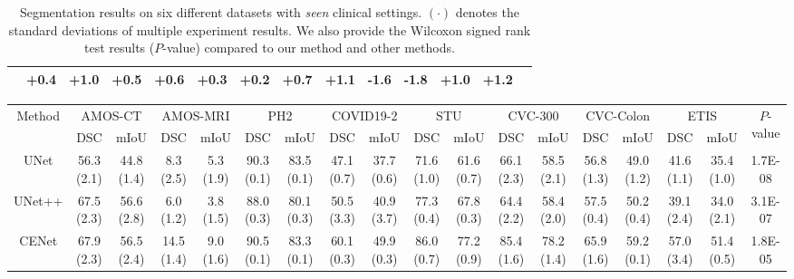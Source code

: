 \begin{table*}[t]
\begin{tabular}{c|cc|cc|cc|cc|cc|cc|c}
     & \textbf{+0.4} & \textbf{+1.0} & \textbf{+0.5} & \textbf{+0.6} & \textbf{+0.3} & \textbf{+0.2} & \textbf{+0.7} & \textbf{+1.1} & \textbf{-1.6} & \textbf{-1.8} & \textbf{+1.0} & \textbf{+1.2} & \\
    \hline
    \end{tabular}
    \caption{Segmentation results on six different datasets with \textit{seen} clinical settings. $(\cdot)$ denotes the standard deviations of multiple experiment results. We also provide the Wilcoxon signed rank test results ($P$-value) compared to our method and other methods.}
    \label{tab:comparison_sota_in_domain}
\end{table*}

\begin{table*}[t]
    \centering
    \scriptsize
    \setlength\tabcolsep{1.25pt} %
    \begin{tabular}{c|cc|cc|cc|cc|cc|cc|cc|cc|c}
    \hline
    \multicolumn{1}{c|}{\multirow{2}{*}{Method}} & \multicolumn{2}{c|}{AMOS-CT \cite{ji2022amos}} & \multicolumn{2}{c|}{AMOS-MRI \cite{ji2022amos}} & \multicolumn{2}{c|}{PH2 \cite{mendoncca2013ph}} & \multicolumn{2}{c|}{COVID19-2 \cite{COVID19_2}} & \multicolumn{2}{c|}{STU \cite{zhuang2019rdau}} & \multicolumn{2}{c}{CVC-300 \cite{vazquez2017benchmark}} & \multicolumn{2}{c}{CVC-Colon \cite{tajbakhsh2015automated}} & \multicolumn{2}{c|}{ETIS \cite{silva2014toward}} & \multicolumn{1}{c}{\multirow{2}{*}{$P$-value}} \\ \cline{2-17}
     & DSC & mIoU & DSC & mIoU & DSC & mIoU & DSC & mIoU & DSC & mIoU & DSC & mIoU & DSC & mIoU & DSC & mIoU & \\
     \hline
     UNet \cite{ronneberger2015u}             & 56.3 \tiny{(2.1)} & 44.8 \tiny{(1.4)} & 8.3 \tiny{(2.5)} & 5.3 \tiny{(1.9)} & 90.3 \tiny{(0.1)}  & 83.5 \tiny{(0.1)} & 47.1 \tiny{(0.7)} & 37.7 \tiny{(0.6)} & 71.6 \tiny{(1.0)} & 61.6 \tiny{(0.7)} & 66.1 \tiny{(2.3)} & 58.5 \tiny{(2.1)} & 56.8 \tiny{(1.3)} & 49.0 \tiny{(1.2)} & 41.6 \tiny{(1.1)} & 35.4 \tiny{(1.0)} & 1.7E-08  \\
     UNet++ \cite{zhou2018unet++}             & 67.5 \tiny{(2.3)} & 56.6 \tiny{(2.8)} & 6.0 \tiny{(1.2)} & 3.8 \tiny{(1.5)} & 88.0 \tiny{(0.3)}  & 80.1 \tiny{(0.3)}  & 50.5 \tiny{(3.3)} & 40.9 \tiny{(3.7)} & 77.3 \tiny{(0.4)} & 67.8 \tiny{(0.3)} & 64.4 \tiny{(2.2)} & 58.4 \tiny{(2.0)} & 57.5 \tiny{(0.4)} & 50.2 \tiny{(0.4)} & 39.1 \tiny{(2.4)} & 34.0 \tiny{(2.1)} & 3.1E-07 \\
     CENet \cite{gu2019net}                   & 67.9 \tiny{(2.3)}  & 56.5 \tiny{(2.4)} & 14.5 \tiny{(1.4)} & 9.0 \tiny{(1.6)} & 90.5 \tiny{(0.1)} & 83.3 \tiny{(0.1)} & 60.1 \tiny{(0.3)} & 49.9 \tiny{(0.3)} & 86.0 \tiny{(0.7)} & 77.2 \tiny{(0.9)} & 85.4 \tiny{(1.6)} & 78.2 \tiny{(1.4)} & 65.9 \tiny{(1.6)} & 59.2 \tiny{(0.1)} & 57.0 \tiny{(3.4)} & 51.4 \tiny{(0.5)} & 1.8E-05 \\

\end{tabular}
\end{table*}
